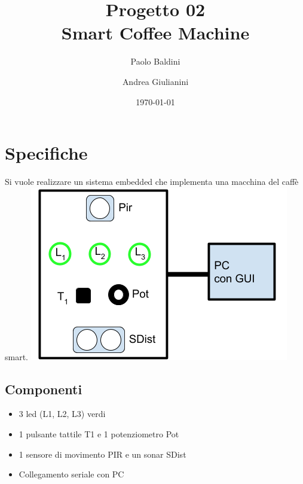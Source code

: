 \documentclass{article}
\title{Progetto 02 \\ Smart Coffee Machine} %
\author{Paolo Baldini \and Andrea Giulianini} %
\date{\today} %
\begin{document}
\maketitle %

\newpage


\section{Specifiche}

Si vuole realizzare un sistema embedded che implementa una macchina del caffè smart.
\newline\newline
\includegraphics[scale=0.55,center]{res/img/scm.png}


\subsection{Componenti}

\begin{itemize}
	\item 3 led (L1, L2, L3) verdi
	\item 1 pulsante tattile T1 e 1 potenziometro Pot
	\item 1 sensore di movimento PIR e un sonar SDist
	\item Collegamento seriale con PC
\end{itemize}
\end{document}

